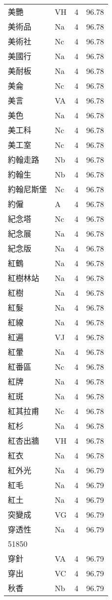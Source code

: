 \documentclass[twocolumn]{book}
\begin{document}
\begin{supertabular}{llrr}
美艷 & VH & 4 &  96.78\\
美術品 & Na & 4 &  96.78\\
美術社 & Nc & 4 &  96.78\\
美國行 & Na & 4 &  96.78\\
美耐板 & Na & 4 &  96.78\\
美侖 & Nc & 4 &  96.78\\
美言 & VA & 4 &  96.78\\
美色 & Na & 4 &  96.78\\
美工科 & Nc & 4 &  96.78\\
美工室 & Nc & 4 &  96.78\\
約翰走路 & Nb & 4 &  96.78\\
約翰生 & Nb & 4 &  96.78\\
約翰尼斯堡 & Nc & 4 &  96.78\\
約僱 & A & 4 &  96.78\\
紀念塔 & Nc & 4 &  96.78\\
紀念展 & Na & 4 &  96.78\\
紀念版 & Na & 4 &  96.78\\
紅鶴 & Na & 4 &  96.78\\
紅樹林站 & Na & 4 &  96.78\\
紅樹 & Na & 4 &  96.78\\
紅髮 & Na & 4 &  96.78\\
紅線 & Na & 4 &  96.78\\
紅遍 & VJ & 4 &  96.78\\
紅暈 & Na & 4 &  96.78\\
紅番區 & Nc & 4 &  96.78\\
紅牌 & Na & 4 &  96.78\\
紅斑 & Na & 4 &  96.78\\
紅其拉甫 & Nc & 4 &  96.78\\
紅杉 & Na & 4 &  96.78\\
紅杏出牆 & VH & 4 &  96.78\\
紅衣 & Na & 4 &  96.78\\
紅外光 & Na & 4 &  96.79\\
紅毛 & Na & 4 &  96.79\\
紅土 & Na & 4 &  96.79\\
突變成 & VG & 4 &  96.79\\
穿透性 & Na & 4 &  96.79\\
51850\\
穿針 & VA & 4 &  96.79\\
穿出 & VC & 4 &  96.79\\
秋香 & Nb & 4 &  96.79\\

\end{supertabular}
\end{document}
